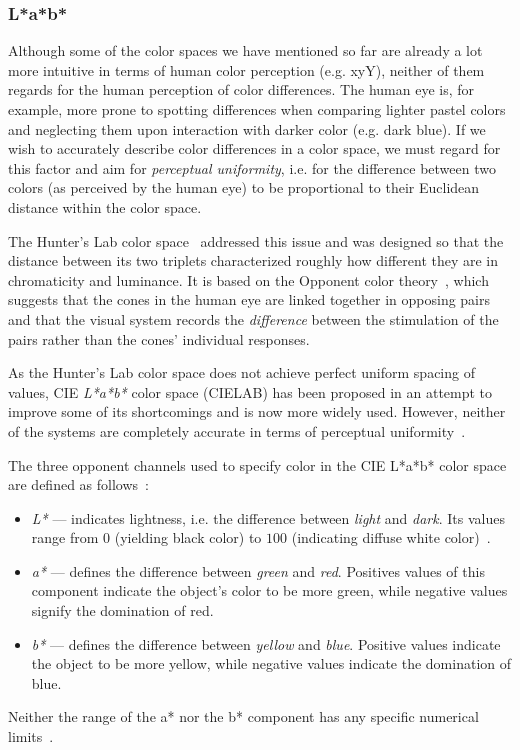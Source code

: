 \subsubsection{L*a*b*}

Although some of the color spaces we have mentioned so far are already a lot more intuitive in terms of human color perception (e.g. xyY), neither of them regards for the human perception of color differences. The human eye is, for example, more prone to spotting differences when comparing lighter pastel colors and neglecting them upon interaction with darker color (e.g. dark blue). If we wish to accurately describe color differences in a color space, we must regard for this factor and aim for \emph{perceptual uniformity}, i.e. for the difference between two colors (as perceived by the human eye) to be proportional to their Euclidean distance within the color space.

The Hunter's Lab color space~\cite{hunterLabCIELabComparison} addressed this issue and was designed so that the distance between its two triplets characterized roughly how different they are in chromaticity and luminance. It is based on the Opponent color theory~\cite{opponentColorTheory}, which suggests that the cones in the human eye are linked together in opposing pairs and that the visual system records the \emph{difference} between the stimulation of the pairs rather than the cones' individual responses.

As the Hunter's Lab color space does not achieve perfect uniform spacing of values, CIE \emph{L*a*b*} color space (CIELAB) has been proposed in an attempt to improve some of its shortcomings and is now more widely used. However, neither of the systems are completely accurate in terms of perceptual uniformity~\cite{hunterLabCIELabComparison}.

The three opponent channels used to specify color in the CIE L*a*b* color space are defined as follows~\cite{labColorScale}:
\begin{itemize}
	\item \emph{L*} --- indicates lightness, i.e. the difference between \emph{light} and \emph{dark}. Its values range from $0$ (yielding black color) to $100$ (indicating diffuse white color)~\cite{labColorScale}.
	\item \emph{a*} --- defines the difference between \emph{green} and \emph{red}. Positives values of this component indicate the object's color to be more green, while negative values signify the domination of red.
	\item \emph{b*} --- defines the difference between \emph{yellow} and \emph{blue}. Positive values indicate the object to be more yellow, while negative values indicate the domination of blue.
\end{itemize}
Neither the range of the a* nor the b* component has any specific numerical limits~\cite{labColorScale}.

